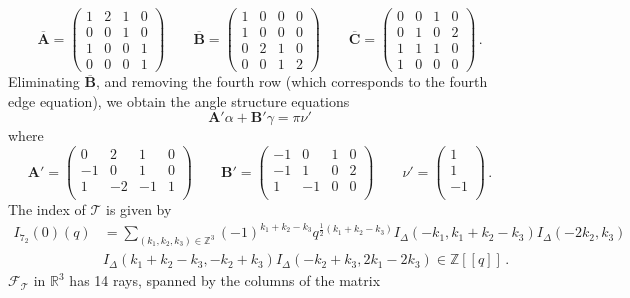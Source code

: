 \documentclass[12pt]{amsart}
\theoremstyle{definition}
\theoremstyle{remark}
\def\BZ{\mathbb Z}
\def\BR{\mathbb R}
\def\calF{\mathcal F}
\def\a{\alpha}
\newcommand{\CT}{\mathcal{T}}
\def\ID{I_{\Delta}}
\newcommand{\mb}{\mathbf}
\begin{document}
$$
\overline{\mb A} =
\left(
\begin{array}{cccc}
 1 & 2 & 1 & 0 \\
 0 & 0 & 1 & 0 \\
 1 & 0 & 0 & 1 \\
 0 & 0 & 0 & 1 
\end{array}
\right)
\qquad
\overline{\mb B} =
\left(
\begin{array}{cccc}
 1 & 0 & 0 & 0 \\
 1 & 0 & 0 & 0 \\
 0 & 2 & 1 & 0 \\
 0 & 0 & 1 & 2 
\end{array}
\right)
\qquad
\overline{\mb C} =
\left(
\begin{array}{cccc}
 0 & 0 & 1 & 0 \\
 0 & 1 & 0 & 2 \\
 1 & 1 & 1 & 0 \\
 1 & 0 & 0 & 0
\end{array}
\right) \, .
$$
Eliminating $\overline{\mb B}$, and removing the fourth row (which corresponds 
to the fourth edge equation), we obtain the angle
structure equations
$$
\mb A' \a + \mb B' \gamma = \pi \nu' 
$$
where
$$
\mb A'=
\left(
\begin{array}{cccc}
 0 & 2 & 1 & 0 \\
 -1 & 0 & 1 & 0 \\
 1 & -2 & -1 & 1 \\
\end{array}
\right)
\qquad 
\mb B'=
\left(
\begin{array}{cccc}
 -1 & 0 & 1 & 0 \\
 -1 & 1 & 0 & 2 \\
 1 & -1 & 0 & 0 \\
\end{array}
\right)
\qquad 
\nu'=
\left(
\begin{array}{c}
1 \\
1 \\
-1 \\
\end{array}
\right) \, .
$$
The index of $\CT$ is given by
\begin{align*}
I_{7_2}(0)(q) &= \sum_{(k_1,k_2,k_3) \in \BZ^3} 
(-1)^{k_1+k_2-k_3} q^{\frac{1}{2} (k_1+k_2-k_3)} 
\ID(-k_1,k_1+k_2-k_3) \ID(-2 k_2,k_3) \\
 & \ID(k_1+k_2-k_3,-k_2+k_3) \ID(-k_2+k_3,2 k_1-2 k_3)
\in \BZ[[q]] \, .
\end{align*}
$\calF_{\CT}$ in $\BR^3$ has 14 rays, spanned by the columns of the matrix
\end{document}

